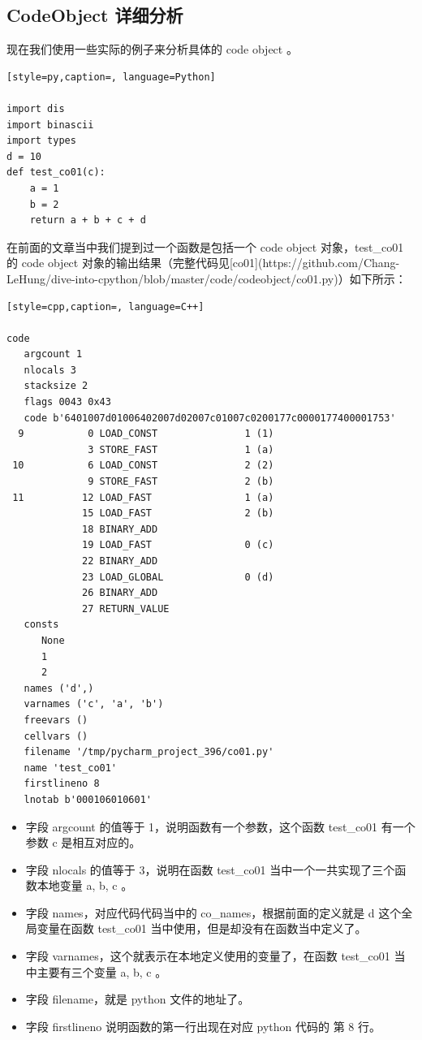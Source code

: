 \subsection{	CodeObject 详细分析}
现在我们使用一些实际的例子来分析具体的 code object 。
\begin{lstlisting}[style=py,caption=, language=Python]

import dis
import binascii
import types
d = 10
def test_co01(c):
    a = 1
    b = 2
    return a + b + c + d
\end{lstlisting}
在前面的文章当中我们提到过一个函数是包括一个 code object 对象，test\_co01 的 code object 对象的输出结果（完整代码见[co01](https://github.com/Chang-LeHung/dive-into-cpython/blob/master/code/codeobject/co01.py)）如下所示：
\begin{lstlisting}[style=cpp,caption=, language=C++]

code
   argcount 1
   nlocals 3
   stacksize 2
   flags 0043 0x43
   code b'6401007d01006402007d02007c01007c0200177c0000177400001753'
  9           0 LOAD_CONST               1 (1)
              3 STORE_FAST               1 (a)
 10           6 LOAD_CONST               2 (2)
              9 STORE_FAST               2 (b)
 11          12 LOAD_FAST                1 (a)
             15 LOAD_FAST                2 (b)
             18 BINARY_ADD
             19 LOAD_FAST                0 (c)
             22 BINARY_ADD
             23 LOAD_GLOBAL              0 (d)
             26 BINARY_ADD
             27 RETURN_VALUE
   consts
      None
      1
      2
   names ('d',)
   varnames ('c', 'a', 'b')
   freevars ()
   cellvars ()
   filename '/tmp/pycharm_project_396/co01.py'
   name 'test_co01'
   firstlineno 8
   lnotab b'000106010601'
\end{lstlisting}
\begin{itemize}
\item 字段 argcount 的值等于 1，说明函数有一个参数，这个函数 test\_co01 有一个参数 c 是相互对应的。 
\item 字段 nlocals 的值等于 3，说明在函数 test\_co01 当中一个一共实现了三个函数本地变量 a, b, c 。 
\item 字段 names，对应代码代码当中的 co\_names，根据前面的定义就是 d 这个全局变量在函数  test\_co01 当中使用，但是却没有在函数当中定义了。 
\item 字段 varnames，这个就表示在本地定义使用的变量了，在函数 test\_co01 当中主要有三个变量 a, b, c 。 
\item 字段 filename，就是 python 文件的地址了。 
\item 字段 firstlineno 说明函数的第一行出现在对应 python 代码的 第 8 行。 
\end{itemize}
